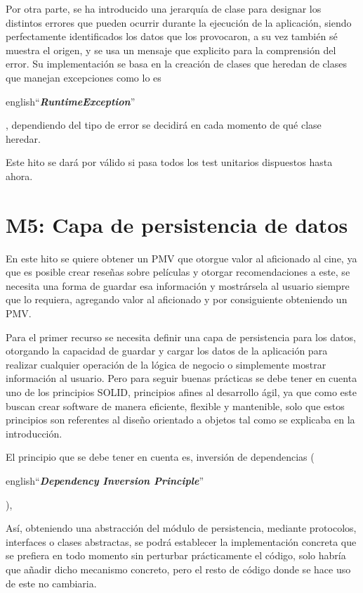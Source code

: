 Por otra parte, se ha introducido una jerarquía de clase para designar los distintos errores que pueden ocurrir
durante la ejecución de la aplicación, siendo perfectamente identificados los datos que los provocaron, a su vez 
también sé muestra el origen, y se usa un mensaje que explicito para la comprensión del error. Su implementación se 
basa en la creación de clases que heredan de clases que manejan excepciones como lo es 
\begin{otherlanguage} {english}``\textit{\textbf{RuntimeException}}''\end{otherlanguage}, 
dependiendo del tipo de error se decidirá en cada momento de qué clase heredar.

Este hito se dará por válido si pasa todos los test unitarios dispuestos hasta ahora.

\section{M5: Capa de persistencia de datos}

En este hito se quiere obtener un PMV que otorgue valor al aficionado al cine, ya que es posible crear reseñas 
sobre películas y otorgar recomendaciones a este, se necesita una forma de guardar esa información y 
mostrársela al usuario siempre que lo requiera, agregando valor al aficionado y por consiguiente obteniendo un PMV.

Para el primer recurso se necesita definir una capa de persistencia para los datos, otorgando la capacidad de 
guardar y cargar los datos de la aplicación para realizar cualquier operación de la lógica de negocio o simplemente 
mostrar información al usuario. Pero para seguir buenas prácticas se debe tener en cuenta uno de los principios 
SOLID, principios afines al desarrollo ágil\cite{AgilPrinc}, ya que como este buscan crear software de 
manera eficiente, flexible y mantenible, solo que estos principios son referentes al diseño orientado a objetos tal como se explicaba 
en la introducción. 

El principio que se debe tener en cuenta es, inversión de dependencias 
(\begin{otherlanguage} {english}``\textit{\textbf{Dependency Inversion Principle}}''\end{otherlanguage}), 

Así, obteniendo una abstracción del módulo de persistencia, mediante protocolos, interfaces o clases abstractas, se 
podrá establecer la implementación concreta que se prefiera en todo momento sin perturbar prácticamente el código, 
solo habría que añadir dicho mecanismo concreto, pero el resto de código donde se hace uso de este no cambiaria.

